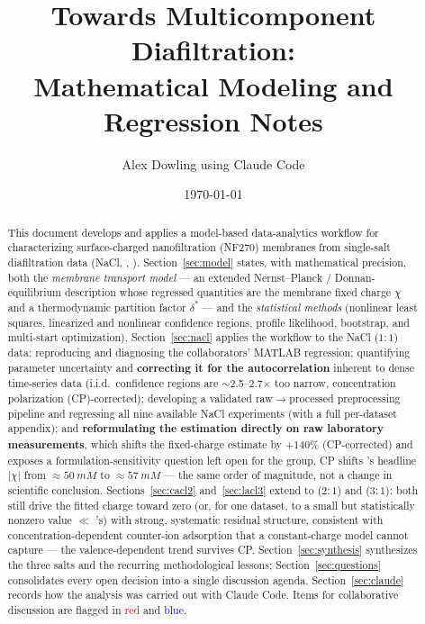\documentclass[11pt]{article}
\title{\textbf{Towards Multicomponent Diafiltration:\\ Mathematical Modeling and Regression Notes}}
\author{Alex Dowling using Claude Code}
\date{\today}
\newcommand{\dstar}{\delta^{*}}
\begin{document}
\maketitle

\begin{abstract}
\noindent This
document develops and applies a model-based data-analytics
workflow for characterizing surface-charged nanofiltration (NF270) membranes
from single-salt diafiltration data (NaCl, , ).
Section~\ref{sec:model} states, with
mathematical precision, both the \emph{membrane transport model} --- an
extended Nernst--Planck / Donnan-equilibrium description whose regressed
quantities are the membrane fixed charge $\chi$ and a thermodynamic partition
factor $\dstar$ --- and the \emph{statistical methods} (nonlinear least squares,
linearized and nonlinear confidence regions, profile likelihood, bootstrap, and
multi-start optimization). Section~\ref{sec:nacl} applies the workflow to the
NaCl ($1{:}1$) data: reproducing and diagnosing the collaborators' MATLAB
regression; quantifying parameter uncertainty and \textbf{correcting it for
the autocorrelation} inherent to dense time-series data (i.i.d.\ confidence
regions are $\sim$2.5--2.7$\times$ too narrow, concentration polarization (CP)-corrected); developing a validated
raw$\to$processed preprocessing pipeline and regressing all nine available
NaCl experiments (with a full per-dataset appendix); and
\textbf{reformulating the estimation directly on raw laboratory
measurements}, which shifts the fixed-charge estimate by $+140\%$ (CP-corrected)
and exposes
a formulation-sensitivity question left open for the group. CP shifts 's headline
$|\chi|$ from $\approx\SI{50}{mM}$ to $\approx\SI{57}{mM}$ --- the same order
of magnitude, not a change in scientific conclusion. Sections~\ref{sec:cacl2}
and~\ref{sec:lacl3} extend to  ($2{:}1$) and  ($3{:}1$):
both still drive the fitted charge toward zero (or, for one  dataset,
to a small but statistically nonzero value $\ll$ 's) with strong,
systematic residual structure, consistent with concentration-dependent
counter-ion adsorption that a constant-charge model cannot capture --- the
valence-dependent trend survives CP.
Section~\ref{sec:synthesis} synthesizes the three salts and the recurring
methodological lessons; Section~\ref{sec:questions} consolidates every open
decision into a single discussion agenda.
Section~\ref{sec:claude} records how the analysis was carried out with Claude
Code. Items for collaborative discussion are flagged in \textcolor{red}{red} and \textcolor{blue}{blue}.
\end{abstract}
\end{document}
